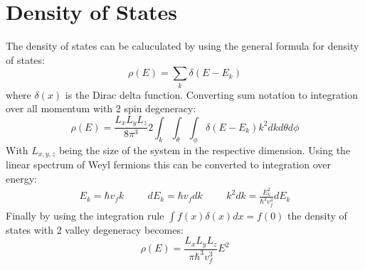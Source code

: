 		\section{Density of States}
		\label{weyl - Density of States}
			The density of states can be caluculated by using the general formula for density of states:
			\begin{equation}
				\rho\left(E\right)=\sum_{k}\delta\left(E-E_{k}\right)
			\end{equation}
			where $\delta\left(x\right)$ is the Dirac delta function. Converting sum notation to integration over all momentum with 2 spin degeneracy:
			\begin{equation}
				\rho\left(E\right)=\frac{L_{x}L_{y}L_{z}}{8\pi^{3}}2\int_{k}\int_{\theta}\int_{\phi}\delta\left(E-E_{k}\right)k^{2}dkd\theta d\phi
			\end{equation}
			With $L_{x,y,z}$ being the size of the system in the respective dimension. Using the linear spectrum of Weyl fermions this can be converted to integration over energy:
			\begin{align}
				E_{k}=\hbar v_{f}k
				\hspace{1cm}
				dE_{k}=\hbar v_{f}dk
				\hspace{1cm}
				k^{2}dk=\frac{E_{k}^{2}}{\hbar^{3}v_{f}^{3}}dE_{k}
			\end{align}
			Finally by using the integration rule $\int f(x)\delta(x) dx=f(0)$ the density of states with 2 valley degeneracy becomes:
			\begin{equation}
				\rho\left(E\right)=\frac{L_{x}L_{y}L_{z}}{\pi\hbar^{3}v_{f}^{3}}E^{2}
			\end{equation}
